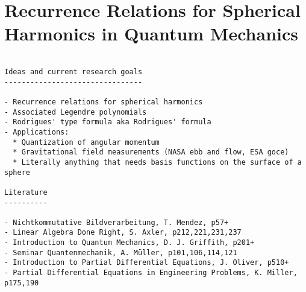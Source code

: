%

%
%
\chapter{Recurrence Relations for Spherical Harmonics in Quantum Mechanics\label{chapter:kugel}}
\begin{refsection}

\begin{verbatim}

Ideas and current research goals
--------------------------------

- Recurrence relations for spherical harmonics
- Associated Legendre polynomials
- Rodrigues' type formula aka Rodrigues' formula
- Applications:
  * Quantization of angular momentum
  * Gravitational field measurements (NASA ebb and flow, ESA goce)
  * Literally anything that needs basis functions on the surface of a sphere

Literature
----------

- Nichtkommutative Bildverarbeitung, T. Mendez, p57+
- Linear Algebra Done Right, S. Axler, p212,221,231,237
- Introduction to Quantum Mechanics, D. J. Griffith, p201+
- Seminar Quantenmechanik, A. Müller, p101,106,114,121
- Introduction to Partial Differential Equations, J. Oliver, p510+
- Partial Differential Equations in Engineering Problems, K. Miller, p175,190

\end{verbatim}


\printbibliography[heading=subbibliography]
\end{refsection}
